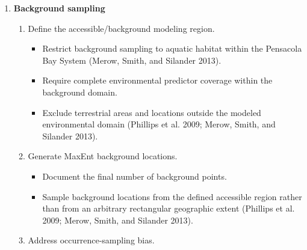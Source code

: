 \documentclass[
  letterpaper,
  DIV=11,
  numbers=noendperiod]{scrartcl}
\providecommand{\tightlist}{%
  \setlength{\itemsep}{0pt}\setlength{\parskip}{0pt}}
\begin{document}
\begin{enumerate}
\begin{enumerate}
    \begin{itemize}
    \tightlist
    \item
      Use a reproducible procedure that avoids disproportionately
      representing large or densely mapped oyster polygons (Phillips et
      al. 2009; Merow, Smith, and Silander 2013).
    \item
      Document the initial number of oyster polygons and final number of
      presence observations.
    \end{itemize}
  \item
    Evaluate spatial clustering of presence observations.

    \begin{itemize}
    \tightlist
    \item
      Apply spatial thinning where necessary to reduce clustering and
      sampling bias (Phillips et al. 2009).
    \item
      Base thinning decisions on spatial dependence and sampling
      structure rather than arbitrary data reduction (Phillips et al.
      2009; Merow, Smith, and Silander 2013).
    \end{itemize}
  \end{enumerate}
\item
  \textbf{Background sampling}

  \begin{enumerate}
  \def\labelenumii{\arabic{enumii}.}
  \tightlist
  \item
    Define the accessible/background modeling region.

    \begin{itemize}
    \tightlist
    \item
      Restrict background sampling to aquatic habitat within the
      Pensacola Bay System (Merow, Smith, and Silander 2013).
    \item
      Require complete environmental predictor coverage within the
      background domain.
    \item
      Exclude terrestrial areas and locations outside the modeled
      environmental domain (Phillips et al. 2009; Merow, Smith, and
      Silander 2013).
    \end{itemize}
  \item
    Generate MaxEnt background locations.

    \begin{itemize}
    \tightlist
    \item
      Document the final number of background points.
    \item
      Sample background locations from the defined accessible region
      rather than from an arbitrary rectangular geographic extent
      (Phillips et al. 2009; Merow, Smith, and Silander 2013).
    \end{itemize}
  \item
    Address occurrence-sampling bias.


\end{enumerate}
\end{enumerate}
\end{document}
